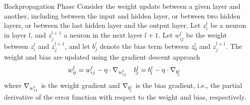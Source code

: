 %
%
%
\begin{frame}{Backpropagation Phase}
Consider the weight update between a given layer and another, including
between the input and hidden layer, or between two hidden layers, or
between the last hidden layer and the output layer. 
Let $z^l_i$ be a neuron in layer $l$, and $z^{l+1}_{\!j}$ a neuron in the next
layer $l+1$. Let $w^l_{ij}$ be the weight between $z^l_i$ and
$z^{l+1}_j$, and let $b^l_{\!j}$ denote the bias term between
$z^l_0$ and $z^{l+1}_j$.
The weight and bias are updated using the gradient descent approach
\begin{align*}
   w^l_{i\!j} & = w^l_{ij} - \eta \cdot \nabla_{w^l_{ij}} &
   b^l_{\!j} & = b^l_{\!j} - \eta \cdot \nabla_{b^l_{\!j}}
\end{align*}
where $\nabla_{w^l_{ij}}$ is the weight gradient and
$\nabla_{b^l_{\!j}}$ is the bias gradient, i.e., the partial
derivative of the error function with
respect to the weight and bias, respectively.
\end{frame}
%
